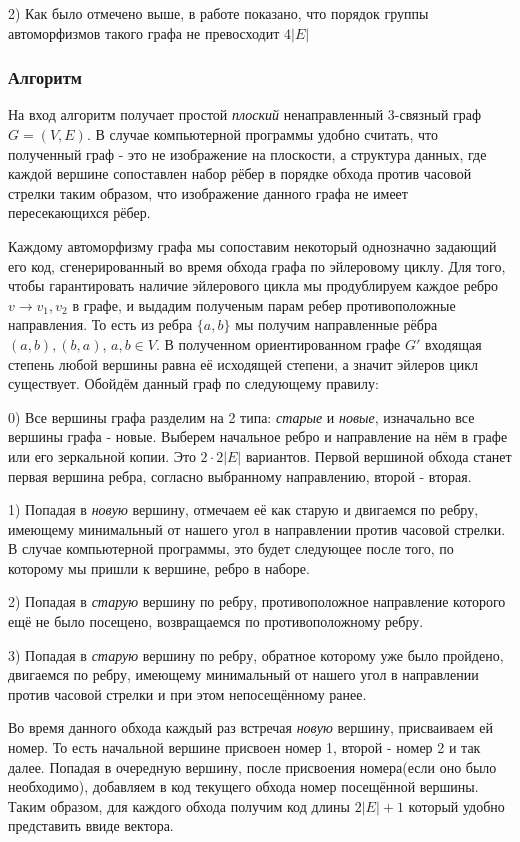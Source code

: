2) Как было отмечено выше, в работе \cite{4} показано, что порядок группы автоморфизмов такого графа не превосходит $4|E|$

\subsubsection*{Алгоритм}
На вход алгоритм получает простой \textit{плоский} ненаправленный 3-связный граф $G=(V, E)$. В случае компьютерной программы удобно считать, что полученный граф - это не изображение на плоскости, а структура данных, где каждой вершине сопоставлен набор рёбер в порядке обхода против часовой стрелки таким образом, что изображение данного графа не имеет пересекающихся рёбер. 

Каждому автоморфизму графа мы сопоставим некоторый однозначно задающий его код, сгенерированный во время обхода графа по эйлеровому циклу. Для того, чтобы гарантировать наличие эйлерового цикла мы продублируем каждое ребро $v \rightarrow v_1, v_2$ в графе, и выдадим полученым парам ребер противоположные направления. То есть из ребра $\{a, b\}$ мы получим направленные рёбра $(a, b), (b, a)$, $a, b \in V$. В полученном ориентированном графе $G'$ входящая степень любой вершины равна её исходящей степени, а значит эйлеров цикл существует. Обойдём данный граф по следующему правилу:

    0) Все вершины графа разделим на 2 типа: \textit{старые} и \textit{новые}, изначально все вершины графа - новые. Выберем начальное ребро и направление на нём в графе или его зеркальной копии. Это $2 \cdot 2|E|$ вариантов. Первой вершиной обхода станет первая вершина ребра, согласно выбранному направлению, второй - вторая.
    
    1) Попадая в \textit{новую} вершину, отмечаем её как старую и двигаемся по ребру, имеющему минимальный от нашего угол в направлении против часовой стрелки. В случае компьютерной программы, это будет следующее после того, по которому мы пришли к вершине, ребро в наборе.

    2) Попадая в \textit{старую} вершину по ребру, противоположное направление которого ещё не было посещено, возвращаемся по противоположному ребру.

    3) Попадая в \textit{старую} вершину по ребру, обратное которому уже было пройдено, двигаемся по ребру, имеющему минимальный от нашего угол в направлении против часовой стрелки и при этом непосещённому ранее.

Во время данного обхода каждый раз встречая \textit{новую} вершину, присваиваем ей номер. То есть начальной вершине присвоен номер 1, второй - номер 2 и так далее. Попадая в очередную вершину, после присвоения номера(если оно было необходимо), добавляем в код текущего обхода номер посещённой вершины. Таким образом, для каждого обхода получим код длины $2|E| + 1$ который удобно представить ввиде вектора.


